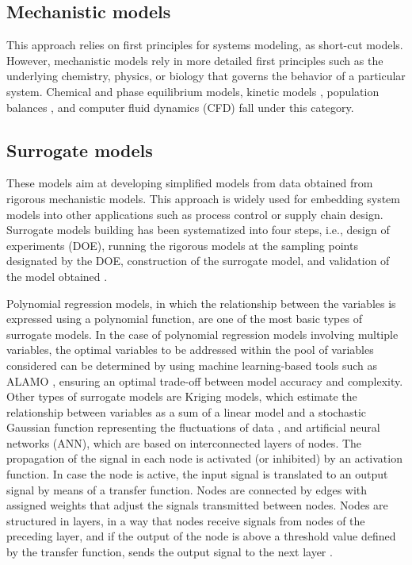 \begin{refsection}[referencesCh1]
\subsection{Mechanistic models}
This approach relies on first principles for systems modeling, as short-cut models. However, mechanistic models rely in more detailed first principles such as the underlying chemistry, physics, or biology that governs the behavior of a particular system. Chemical \citep{loeppert1995chemical} and phase \citep{brignole2013phase} equilibrium models, kinetic models \citep{buzzi2009kinetic}, population balances \citep{ramkrishna2000population}, and computer fluid dynamics (CFD) \citep{anderson1995computational} fall under this category.

\subsection{Surrogate models}
These models aim at developing simplified models from data obtained from rigorous mechanistic models. This approach is widely used for embedding system models into other applications such as process control or supply chain design. Surrogate models building has been systematized into four steps, i.e., design of experiments (DOE), running the rigorous models at the sampling points designated by the DOE, construction of the surrogate model, and validation of the model obtained \citep{queipo2005surrogate}.

Polynomial regression models, in which the relationship between the variables is expressed using a polynomial function, are one of the most basic types of surrogate models. In the case of polynomial regression models involving multiple variables, the optimal variables to be addressed within the pool of variables considered can be determined by using machine learning-based tools such as ALAMO \citep{wilson2017alamo}, ensuring an optimal trade-off between model accuracy and complexity. Other types of surrogate models are Kriging models, which estimate the relationship between variables as a sum of a linear model and a stochastic Gaussian function representing the fluctuations of data \citep{quirante2015rigorous}, and artificial neural networks (ANN), which are based on interconnected layers of nodes.
The propagation of the signal in each node is activated (or inhibited) by an activation function. In case the node is active, the input signal is translated to an output signal by means of a transfer function.
Nodes are connected by edges with assigned weights that adjust the signals transmitted between nodes. Nodes are structured in layers, in a way that nodes receive signals from nodes of the preceding layer, and if the output of the node is above a threshold value defined by the transfer function, sends the output signal to the next layer \citep{himmelblau2000applications}.


\end{refsection}
